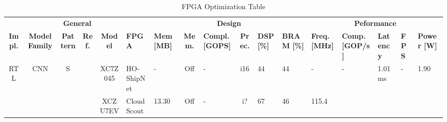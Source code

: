 \documentclass{article}
\begin{document}
\tiny
\begin{table}
\centering

\caption{FPGA Optimization Table}
\label{table:fpga_optim}
\begin{adjustbox}{totalheight=\baselineskip,}

\begin{tabular}{ccccclp{2em}cp{3em}cp{2em}p{4em}p{3em}p{3.5em}p{3.5em}p{2.5em}p{3em}}
 \multicolumn{6}{c}{\textbf{General}} & \multicolumn{6}{c}{\textbf{Design}} & \multicolumn{5}{c}{\textbf{Peformance}}  \\
 \cmidrule(lr){1-6}  \cmidrule(lr){7-12} \cmidrule (lr){13-17}

\textbf{Impl.}&\textbf{Model Family} &\textbf{Pattern} &\textbf{Ref.} &\textbf{Model} &\textbf{FPGA} &\textbf{Mem [MB]} &\textbf{Mem.} &\textbf{Compl. [GOPS]} &\textbf{Prec.} &\textbf{DSP [\%]} &\textbf{BRAM [\%]} &\textbf{Freq. [MHz]} &\textbf{Comp. [GOP/s]} &\textbf{Latency} &\textbf{FPS}&\textbf{Power [W]} \\
 \toprule
 \multirow{27}{*}{RTL}
   &\multirow{19}{*}{CNN}
       &\multirow{6}{*}{S}
           &\multirow{1}{*}{\cite{ieracitanoExplainableEmbeddedNeural2024}}
               &\multirow{1}{*}{XC7Z045}
                   &\multirow{1}{*}{HO-ShipNet}
                       &\multirow{1}{*}{-}
                           &\multirow{1}{*}{Off}
                               &\multirow{1}{*}{-}
                                   &\multirow{1}{*}{i16}
                                       &\multirow{1}{*}{44}
                                           &\multirow{1}{*}{44}
                                               &\multirow{1}{*}{-}
                                                   &\multirow{1}{*}{-}
                                                       &\multirow{1}{*}{1.01 ms}
                                                           &\multirow{1}{*}{-}
                                                               &\multirow{1}{*}{1.90}\\
\cmidrule{4-17}
   &   &   &\multirow{1}{*}{\cite{rapuanoFPGAbasedHardwareAccelerator2021a}}
               &\multirow{1}{*}{XCZU7EV}
                   &\multirow{1}{*}{CloudScout}
                       &\multirow{1}{*}{13.30}
                           &\multirow{1}{*}{Off}
                               &\multirow{1}{*}{-}
                                   &\multirow{1}{*}{i?}
                                       &\multirow{1}{*}{67}
                                           &\multirow{1}{*}{46}
                                               &\multirow{1}{*}{115.4}

\end{tabular}
\end{adjustbox}
\end{table}
\end{document}
